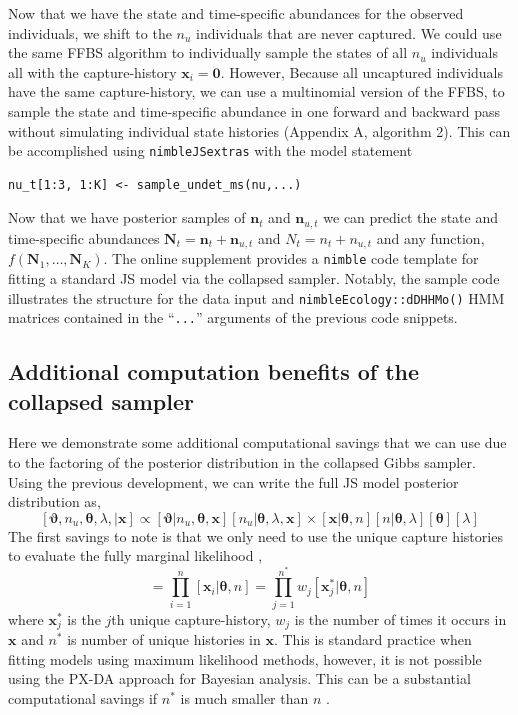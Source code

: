 \documentclass[12pt]{article}
\newcommand{\bx}{\ensuremath{\mathbf{x}}}
\newcommand{\bn}{\ensuremath{\mathbf{n}}}
\newcommand{\bN}{\ensuremath{\mathbf{N}}}
\newcommand{\bt}{\ensuremath{\boldsymbol{\theta}}}
\newcommand{\bvt}{\ensuremath{\boldsymbol{\vartheta}}}
\begin{document}
Now that we have the state and time-specific abundances for the observed individuals, we shift to the $n_u$ individuals that are never captured. We could use the same FFBS algorithm to individually sample the states of all $n_u$ individuals all with the capture-history $\bx_i=\mathbf{0}$. However, Because all uncaptured individuals have the same capture-history, we can use a multinomial version of the FFBS, to sample the state and time-specific abundance in one forward and backward pass without simulating individual state histories (Appendix A, algorithm 2). This can be accomplished using {\tt nimbleJSextras} with the model statement
\begin{verbatim}
nu_t[1:3, 1:K] <- sample_undet_ms(nu,...)
\end{verbatim}
Now that we have posterior samples of $\bn_t$ and $\bn_{u,t}$ we can predict the state and time-specific abundances $\bN_t =  \bn_t + \bn_{u,t}$ and $N_t =  n_t + n_{u,t}$ and any function, $f(\bN_1,\dots,\bN_K)$. The online supplement provides a \verb|nimble| code template for fitting a standard JS model via the collapsed sampler. Notably, the sample code illustrates the structure for the data input and \verb|nimbleEcology::dDHHMo()| HMM matrices contained in the ``{\tt ...}'' arguments of the previous code snippets. 

\subsection{Additional computation benefits of the collapsed sampler} \label{sec.savings}

Here we demonstrate some additional computational savings that we can use due to the factoring of the posterior distribution in the collapsed Gibbs sampler. Using the previous development, we can write the full JS model posterior distribution as,
\begin{equation}
\label{eq.post.factor}
[\bvt, n_u, \bt,\lambda,|\bx] \propto [\bvt|n_u,\bt,\bx][n_u|\bt,\lambda,\bx]\times [\bx|\bt,n][n|\bt,\lambda][\bt][\lambda] 
\end{equation} 
The first savings to note is that we only need to use the unique capture histories to evaluate the fully marginal likelihood \citep{turek2016efficient},
\begin{equation}
[\bx|\bt,n] = \prod_{i=1}^n [\bx_i|\bt,n] = \prod_{j=1}^{n^*} w_j[\bx_j^*|\bt,n]
\end{equation}
where $\bx_j^*$ is the $j$th unique capture-history, $w_j$ is the number of times it occurs in $\bx$ and $n^*$ is number of unique histories in $\bx$. This is standard practice when fitting models using maximum likelihood methods, however, it is not possible using the PX-DA approach for Bayesian analysis. This can be a substantial computational savings if $n^*$ is much smaller than $n$ \citep{turek2016efficient}. 
\end{document}
